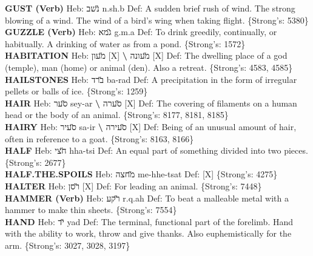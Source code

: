 {\textbf{GUST (Verb)} Heb: {\large\H נשב} n.sh.b Def: A sudden brief rush of wind. The strong blowing of a wind. The wind of a bird's wing when taking flight. \{Strong's: 5380\}\hfill{}\\

\textbf{GUZZLE (Verb)} Heb: {\large\H גמא} g.m.a Def: To drink greedily, continually, or habitually. A drinking of water as from a pond. \{Strong's: 1572\}\hfill{}\\

\textbf{HABITATION} Heb: {\large\H מעון} {[}X{]} \textbf{\textbackslash{}} {\large\H מעונה} {[}X{]} Def: The dwelling place of a god (temple), man (home) or animal (den). Also a retreat. \{Strong's: 4583, 4585\}\hfill{}\\

\textbf{HAILSTONES} Heb: {\large\H ברד} ba-rad Def: A precipitation in the form of irregular pellets or balls of ice. \{Strong's: 1259\}\hfill{}\\

\textbf{HAIR} Heb: {\large\H סער} sey-ar \textbf{\textbackslash{}} {\large\H סערה} {[}X{]} Def: The covering of filaments on a human head or the body of an animal. \{Strong's: 8177, 8181, 8185\}\hfill{}\\

\textbf{HAIRY} Heb: {\large\H סעיר} sa-ir \textbf{\textbackslash{}} {\large\H סעירה} {[}X{]} Def: Being of an unusual amount of hair, often in reference to a goat. \{Strong's: 8163, 8166\}\hfill{}\\

\textbf{HALF} Heb: {\large\H חצי} hha-tsi Def: An equal part of something divided into two pieces. \{Strong's: 2677\}\hfill{}\\

\textbf{HALF.THE.SPOILS} Heb: {\large\H מחצה} me-hhe-tsat Def: {[}X{]} \{Strong's: 4275\}\hfill{}\\

\textbf{HALTER} Heb: {\large\H רסן} {[}X{]} Def: For leading an animal. \{Strong's: 7448\}\hfill{}\\

\textbf{HAMMER (Verb)} Heb: {\large\H רקע} r.q.ah Def: To beat a malleable metal with a hammer to make thin sheets. \{Strong's: 7554\}\hfill{}\\

\textbf{HAND} Heb: {\large\H יד} yad Def: The terminal, functional part of the forelimb. Hand with the ability to work, throw and give thanks. Also euphemistically for the arm. \{Strong's: 3027, 3028, 3197\}\hfill{}\\

}

